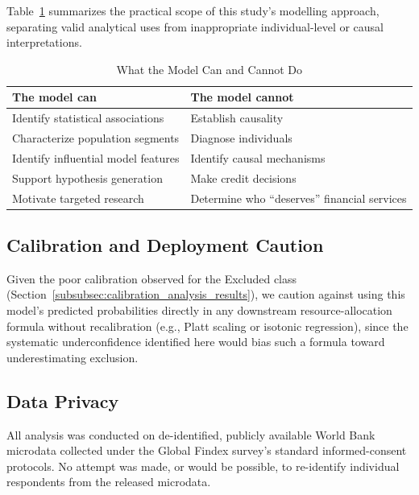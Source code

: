 \documentclass[conference]{IEEEtran}
\begin{document}
Table~\ref{tab:model_can_cannot} summarizes the practical scope of this
study's modelling approach, separating valid analytical uses from
inappropriate individual-level or causal interpretations.

\begin{table}[h]
\caption{What the Model Can and Cannot Do}
\label{tab:model_can_cannot}
\centering
\renewcommand{\arraystretch}{1.2}
\begin{tabular}{p{3.7cm}p{3.7cm}}
\toprule
\textbf{The model can} & \textbf{The model cannot} \\
\midrule
Identify statistical associations & Establish causality \\
Characterize population segments & Diagnose individuals \\
Identify influential model features & Identify causal mechanisms \\
Support hypothesis generation & Make credit decisions \\
Motivate targeted research & Determine who ``deserves'' financial services \\
\bottomrule
\end{tabular}
\end{table}
 
\subsection{Calibration and Deployment Caution}
\label{subsec:calibration_deployment_caution}
Given the poor calibration observed for the Excluded class (Section~\ref{subsubsec:calibration_analysis_results}), we caution against using this model's predicted probabilities directly in any downstream resource-allocation formula without recalibration (e.g., Platt scaling or isotonic regression), since the systematic underconfidence identified here would bias such a formula toward underestimating exclusion.
 
\subsection{Data Privacy}
\label{subsec:data_privacy}
All analysis was conducted on de-identified, publicly available World Bank microdata collected under the Global Findex survey's standard informed-consent protocols. No attempt was made, or would be possible, to re-identify individual respondents from the released microdata.
 
\end{document}
